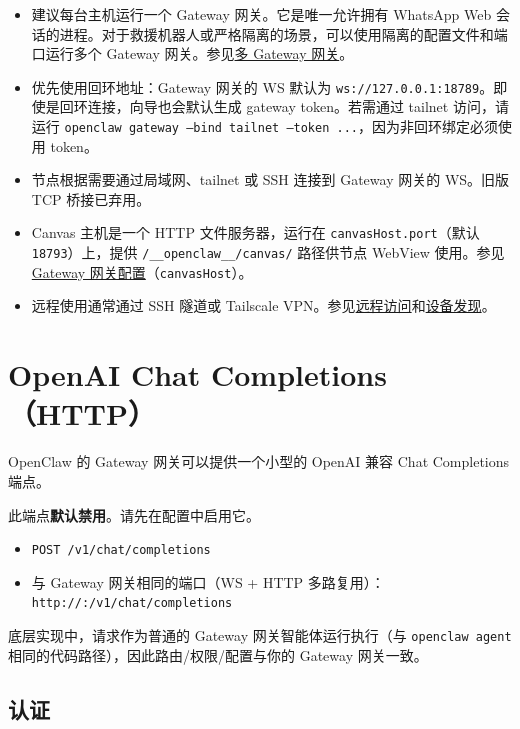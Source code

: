 \begin{itemize}
  \item 建议每台主机运行一个 Gateway 网关。它是唯一允许拥有 WhatsApp Web 会话的进程。对于救援机器人或严格隔离的场景，可以使用隔离的配置文件和端口运行多个 Gateway 网关。参见\href{/gateway/multiple-gateways}{多 Gateway 网关}。
  \item 优先使用回环地址：Gateway 网关的 WS 默认为 \texttt{ws://127.0.0.1:18789}。即使是回环连接，向导也会默认生成 gateway token。若需通过 tailnet 访问，请运行 \texttt{openclaw gateway --bind tailnet --token ...}，因为非回环绑定必须使用 token。
  \item 节点根据需要通过局域网、tailnet 或 SSH 连接到 Gateway 网关的 WS。旧版 TCP 桥接已弃用。
  \item Canvas 主机是一个 HTTP 文件服务器，运行在 \texttt{canvasHost.port}（默认 \texttt{18793}）上，提供 \texttt{/\_\_openclaw\_\_/canvas/} 路径供节点 WebView 使用。参见 \href{/gateway/configuration}{Gateway 网关配置}（\texttt{canvasHost}）。
  \item 远程使用通常通过 SSH 隧道或 Tailscale VPN。参见\href{/gateway/remote}{远程访问}和\href{/gateway/discovery}{设备发现}。
\end{itemize}



\clearpage

\section{OpenAI Chat Completions（HTTP）}


OpenClaw 的 Gateway 网关可以提供一个小型的 OpenAI 兼容 Chat Completions 端点。

此端点\textbf{默认禁用}。请先在配置中启用它。

\begin{itemize}
  \item \texttt{POST /v1/chat/completions}
  \item 与 Gateway 网关相同的端口（WS + HTTP 多路复用）：\texttt{http://:/v1/chat/completions}
\end{itemize}


底层实现中，请求作为普通的 Gateway 网关智能体运行执行（与 \texttt{openclaw agent} 相同的代码路径），因此路由/权限/配置与你的 Gateway 网关一致。

\subsection{认证}


